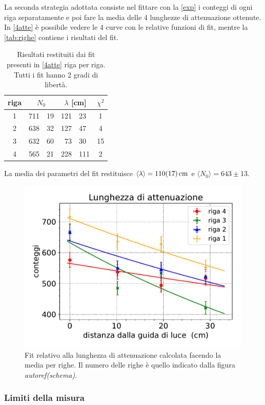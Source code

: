 La seconda strategia adottata consiste nel fittare con la \eqref{exp} i conteggi di ogni riga separatamente e poi fare la media delle 4 lunghezze di attenuazione ottenute.
In \autoref{4atte} è possibile vedere le 4 curve con le relative funzioni di fit, mentre la \autoref{tab:righe} contiene i risultati del fit.
\begin{table}[h]
\centering
\begin{tabular}{| c | r @{$\pm$} l  | r @{$\pm$} l  | c |}
\hline
riga & \multicolumn{2}{c|}{$N_0$} & \multicolumn{2}{c|}{ $\lambda$ [\si{cm}] } & $\chi^2$ \\
\hline
1 & 711&19 & 121&23 & 1\\
2 & 638&32 & 127&47 & 4\\
3 & 632&60 & 73&30 & 15\\
4 & 565&21 & 228&111 & 2\\
\hline
\end{tabular}
\caption{Risultati restituiti dai fit presenti in \autoref{4atte} riga per riga. Tutti i fit hanno 2 gradi di libertà.}
\label{tab:righe}
\end{table}


La media dei parametri del fit restituisce $\langle\lambda\rangle=\SI{110\pm17}{cm}$ e $\langle N_0\rangle=643\pm13$.
\begin{figure}[h]
\centering
\includegraphics[width=8 cm]{4atte}
\caption{Fit relativo alla lunghezza di attenuazione calcolata facendo la media per righe. Il numero delle righe è quello indicato dalla figura \emph{autoref(schema)}.}
\label{4atte}
\end{figure}


\subsubsection{Limiti della misura}

